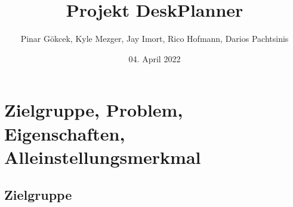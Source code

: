 \documentclass{article}
\title{Projekt DeskPlanner}
\author{Pinar Gökcek, Kyle Mezger, Jay Imort, Rico Hofmann, Darios Pachtsinis}
\date{04. April 2022}
\begin{document}
\begin{titlepage}
    \centering
    \maketitle

    \vfill

\end{titlepage}

\tableofcontents

\pagebreak

\section{Zielgruppe, Problem, Eigenschaften, Alleinstellungsmerkmal}

\subsection{Zielgruppe}
\end{document}
